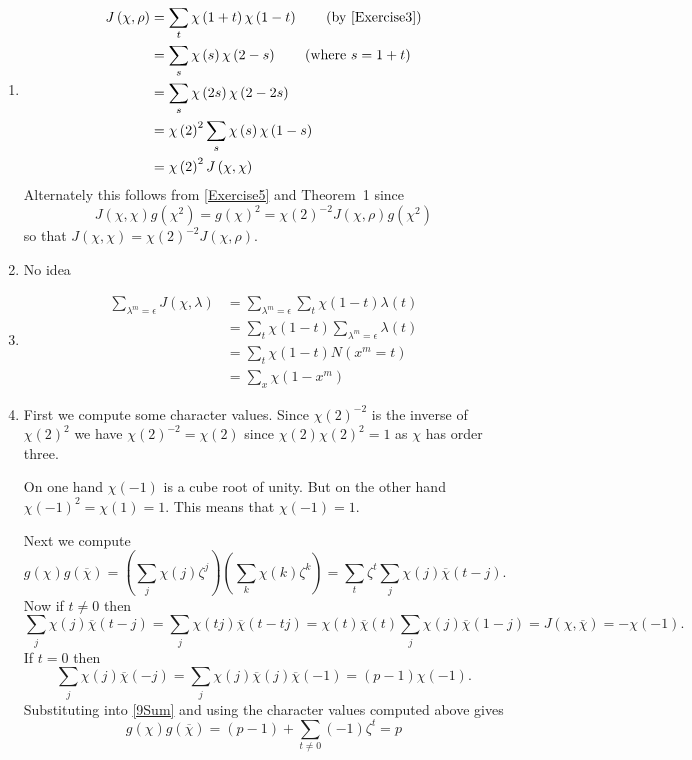 \documentclass[12pt]{article}
\begin{document}
\begin{enumerate}
\item %
\begin{align*}
J\left(\chi,\rho\right)
&=\sum_t\chi\left(1+t\right)\chi\left(1-t\right)
\qquad\text{(by \autoref{Exercise3})}\\
&=\sum_s\chi\left(s\right)\chi\left(2-s\right)
\qquad\text{(where $s=1+t$)}\\
&=\sum_s\chi\left(2s\right)\chi\left(2-2s\right)\\
&=\chi\left(2\right)^2
\sum_s\chi\left(s\right)\chi\left(1-s\right)\\
&=\chi\left(2\right)^2J\left(\chi,\chi\right)
\end{align*}
Alternately this follows from \autoref{Exercise5}
and Theorem~1 since
\[J\left(\chi,\chi\right)g\left(\chi^2\right)
=g\left(\chi\right)^2=\chi\left(2\right)^{-2}
J\left(\chi,\rho\right)g\left(\chi^2\right)\]
so that $J\left(\chi,\chi\right)=\chi\left(2\right)^{-2}
J\left(\chi,\rho\right)$.

\item %
No idea
\item %
\begin{align*}
\sum_{\lambda^m=\epsilon}J\left(\chi,\lambda\right)
&=\sum_{\lambda^m=\epsilon}\sum_t\chi\left(1-t\right)\lambda\left(t\right)\\
&=\sum_t\chi\left(1-t\right)\sum_{\lambda^m=\epsilon}\lambda\left(t\right)\\
&=\sum_t\chi\left(1-t\right)N\left(x^m=t\right)\\
&=\sum_x\chi\left(1-x^m\right)
\end{align*}

\item %
First we compute some character values.
Since $\chi\left(2\right)^{-2}$ is the inverse
of $\chi\left(2\right)^2$
we have $\chi\left(2\right)^{-2}=\chi\left(2\right)$
since $\chi\left(2\right)\chi\left(2\right)^2=1$
as $\chi$ has order three.

On one hand $\chi\left(-1\right)$ is a cube root
of unity. But on the other hand
$\chi\left(-1\right)^2=\chi\left(1\right)=1$.
This means that $\chi\left(-1\right)=1$.

Next we compute
\begin{equation}\label{9Sum}
g\left(\chi\right)g\left(\overline{\chi}\right)
=\left(\sum_j\chi\left(j\right)\zeta^j\right)
\left(\sum_k\chi\left(k\right)\zeta^k\right)
=\sum_t\zeta^t\sum_j\chi\left(j\right)\overline{\chi}\left(t-j\right).
\end{equation}
Now if $t\ne 0$ then
\[\sum_j\chi\left(j\right)\overline{\chi}\left(t-j\right)
=\sum_j\chi\left(tj\right)\overline{\chi}\left(t-tj\right)
=\chi\left(t\right)\overline{\chi}\left(t\right)
\sum_j\chi\left(j\right)\overline{\chi}\left(1-j\right)
=J\left(\chi,\overline{\chi}\right)=-\chi\left(-1\right).\]
If $t=0$ then
\[\sum_j\chi\left(j\right)\overline{\chi}\left(-j\right)
=\sum_j\chi\left(j\right)\overline{\chi}\left(j\right)
\overline{\chi}\left(-1\right)
=\left(p-1\right)\chi\left(-1\right).\]
Substituting into \autoref{9Sum} and using the character values
computed above gives
\[g\left(\chi\right)g\left(\overline{\chi}\right)
=\left(p-1\right)+\sum_{t\ne 0}\left(-1\right)\zeta^t=p\]


\end{enumerate}
\end{document}
